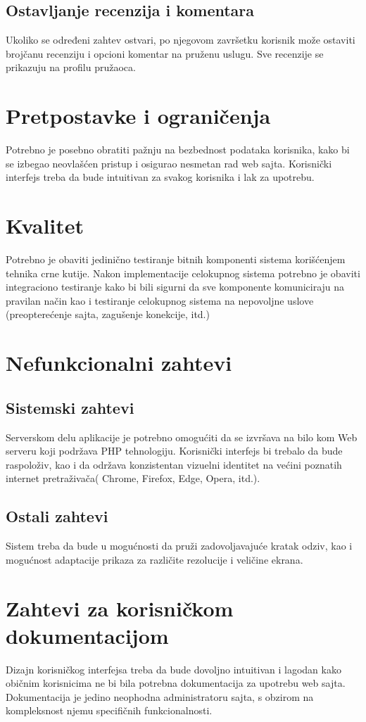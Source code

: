 \documentclass[a4paper,12pt]{report}
\begin{document}
\subsection{Ostavljanje recenzija i komentara}
Ukoliko se određeni zahtev ostvari, po njegovom završetku korisnik može ostaviti brojčanu recenziju i opcioni komentar na pruženu uslugu. Sve recenzije se prikazuju na profilu pružaoca.
\section{Pretpostavke i ograničenja}
Potrebno je posebno obratiti pažnju na bezbednost podataka korisnika, kako bi se izbegao neovlašćen pristup i osigurao nesmetan rad web sajta. Korisnički interfejs treba da bude intuitivan za svakog korisnika i lak za upotrebu.
\section{Kvalitet}
Potrebno je obaviti jedinično testiranje bitnih komponenti sistema korišćenjem tehnika crne kutije. Nakon implementacije celokupnog sistema potrebno je obaviti integraciono testiranje kako bi bili sigurni da sve komponente komuniciraju na pravilan način kao i testiranje celokupnog sistema na nepovoljne uslove (preopterećenje sajta, zagušenje konekcije, itd.)
\section{Nefunkcionalni zahtevi}
\subsection{Sistemski zahtevi}
Serverskom delu aplikacije je potrebno omogućiti da se izvršava na bilo kom Web serveru koji podržava PHP tehnologiju. Korisnički interfejs bi trebalo da bude raspoloživ, kao i da održava konzistentan vizuelni identitet na većini poznatih internet pretraživača( Chrome, Firefox, Edge, Opera, itd.).

\subsection{Ostali zahtevi}
Sistem treba da bude u mogućnosti da pruži zadovoljavajuće kratak odziv, kao i mogućnost adaptacije prikaza za različite rezolucije i veličine ekrana.
\section{Zahtevi za korisničkom dokumentacijom}
Dizajn korisničkog interfejsa treba da bude dovoljno intuitivan i lagodan kako običnim korisnicima ne bi bila potrebna dokumentacija za upotrebu web sajta.
Dokumentacija je jedino neophodna administratoru sajta, s obzirom na kompleksnost njemu specifičnih funkcionalnosti.
\newpage
\end{document}
